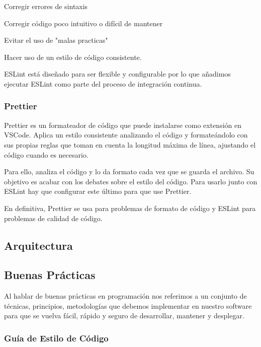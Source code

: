 \documentclass[12pt,twoside,titlepage]{report}
\begin{document}
\begin{compactitem}
 \item Corregir errores de sintaxis
 \item Corregir código poco intuitivo o difícil de mantener
 \item Evitar el uso de "malas practicas"
 \item Hacer uso de un estilo de código consistente.
\end{compactitem}

ESLint está diseñado para ser flexible y configurable por lo que añadimos ejecutar ESLint como parte del proceso de integración continua.

\subsubsection{Prettier}

Prettier es un formateador de código que puede instalarse como extensión en VSCode. Aplica un estilo consistente analizando el código y formateándolo con sus propias reglas que toman en cuenta la longitud máxima de línea, ajustando el código cuando es necesario.

Para ello, analiza el código y lo da formato cada vez que se guarda el archivo. Su objetivo es acabar con los debates sobre el estilo del código. Para usarlo junto con ESLint hay que configurar este último para que use Prettier.

En definitiva, Prettier se usa para problemas de formato de código y ESLint para problemas de calidad de código.

\subsection{Arquitectura}

\subsection{Buenas Prácticas}

Al hablar de buenas prácticas en programación nos referimos a un conjunto de técnicas, principios, metodologías que debemos implementar en nuestro software para que se vuelva fácil, rápido y seguro de desarrollar, mantener y desplegar.

\subsubsection{Guía de Estilo de Código}
\end{document}
